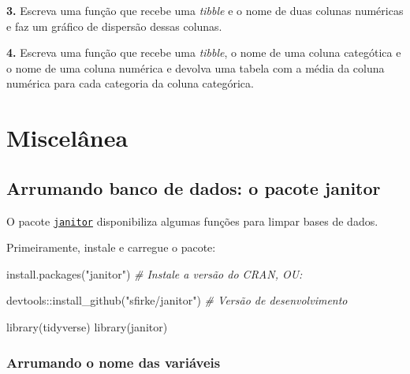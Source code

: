 \documentclass[
]{book}
\newenvironment{Shaded}{\begin{snugshade}}{\end{snugshade}}
\newcommand{\CommentTok}[1]{\textcolor[rgb]{0.56,0.35,0.01}{\textit{#1}}}
\newcommand{\FunctionTok}[1]{\textcolor[rgb]{0.00,0.00,0.00}{#1}}
\newcommand{\NormalTok}[1]{#1}
\newcommand{\SpecialCharTok}[1]{\textcolor[rgb]{0.00,0.00,0.00}{#1}}
\newcommand{\StringTok}[1]{\textcolor[rgb]{0.31,0.60,0.02}{#1}}
\begin{document}
\textbf{3.} Escreva uma função que recebe uma \emph{tibble} e o nome de duas colunas numéricas e faz um gráfico de dispersão dessas colunas.

\textbf{4.} Escreva uma função que recebe uma \emph{tibble}, o nome de uma coluna categótica e o nome de uma coluna numérica e devolva uma tabela com a média da coluna numérica para cada categoria da coluna categórica.

\hypertarget{misc}{%
\chapter{Miscelânea}\label{misc}}

\hypertarget{arrumando-banco-de-dados-o-pacote-janitor}{%
\section{Arrumando banco de dados: o pacote janitor}\label{arrumando-banco-de-dados-o-pacote-janitor}}

O pacote \href{https://garthtarr.github.io/meatR/janitor.html}{\texttt{janitor}} disponibiliza algumas funções para limpar bases de dados.

Primeiramente, instale e carregue o pacote:

\begin{Shaded}
\begin{Highlighting}[]
\FunctionTok{install.packages}\NormalTok{(}\StringTok{"janitor"}\NormalTok{) }\CommentTok{\# Instale a versão do CRAN, OU:}

\NormalTok{devtools}\SpecialCharTok{::}\FunctionTok{install\_github}\NormalTok{(}\StringTok{"sfirke/janitor"}\NormalTok{) }\CommentTok{\# Versão de desenvolvimento}
\end{Highlighting}
\end{Shaded}

\begin{Shaded}
\begin{Highlighting}[]
\FunctionTok{library}\NormalTok{(tidyverse)}
\FunctionTok{library}\NormalTok{(janitor)}
\end{Highlighting}
\end{Shaded}

\hypertarget{arrumando-o-nome-das-variuxe1veis}{%
\subsection{Arrumando o nome das variáveis}\label{arrumando-o-nome-das-variuxe1veis}}
\end{document}
